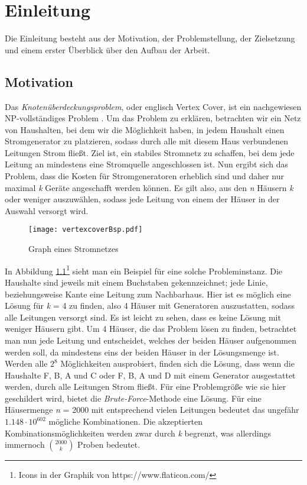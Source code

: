 
\chapter{Einleitung}
\label{ch:Einleitung}
Die Einleitung besteht aus der Motivation, der Problemstellung, der Zielsetzung und einem erster Überblick über den Aufbau der Arbeit.

\section{Motivation}
\label{ch:Einleitung:sec:Motivation}
Das \emph{Knotenüberdeckungsproblem}, oder englisch Vertex Cover, ist ein nachgewiesen NP-vollständiges Problem \cite{intract}. Um das Problem zu erklären, betrachten wir ein Netz von Haushalten, bei dem wir die Möglichkeit haben, in jedem Haushalt einen Stromgenerator zu platzieren, sodass durch alle mit diesem Haus verbundenen Leitungen Strom fließt. Ziel ist, ein stabiles Stromnetz zu schaffen, bei dem jede Leitung an mindestens eine Stromquelle angeschlossen ist. Nun ergibt sich das Problem, dass die Kosten für Stromgeneratoren erheblich sind und daher nur maximal \emph{k} Geräte angeschafft werden können. Es gilt also, aus den \emph{n} Häusern \emph{k} oder weniger auszuwählen, sodass jede Leitung von einem der Häuser in der Auswahl versorgt wird. 
\begin{figure}[htb]
\centering
  	{\texttt{[image: vertexcoverBsp.pdf]}}
	\caption{Graph eines Stromnetzes \label{fig:vc}}
\centering
\end{figure}
In Abbildung \ref{fig:vc}\footnote{Icons in der Graphik von https://www.flaticon.com/}   sieht man ein Beispiel für eine solche Probleminstanz. Die Haushalte sind jeweils mit einem Buchstaben gekennzeichnet; jede Linie, beziehungsweise Kante eine Leitung zum Nachbarhaus. Hier ist es möglich eine Lösung für \emph{k} = 4 zu finden, also 4 Häuser mit Generatoren auszustatten, sodass alle Leitungen versorgt sind. Es ist leicht zu sehen, dass es keine Lösung mit weniger Häusern gibt. Um 4 Häuser, die das Problem lösen zu finden, betrachtet man nun jede Leitung und entscheidet, welches der beiden Häuser aufgenommen werden soll, da mindestens eins der beiden Häuser in der Lösungsmenge ist. Werden alle $2^{8}$ Möglichkeiten ausprobiert, finden sich die Lösung, dass wenn die Haushalte F, B, A und C oder F, B, A und D mit einem Generator ausgestattet werden, durch alle Leitungen Strom fließt. Für eine Problemgröße wie sie hier geschildert wird, bietet die \emph{Brute-Force}-Methode eine Lösung. Für eine Häusermenge \emph{n} = 2000 mit entsprechend vielen Leitungen bedeutet das ungefähr $1.148 \cdot 10^{602}$ mögliche Kombinationen. Die akzeptierten Kombinationsmöglichkeiten werden zwar durch \emph{k} begrenzt, was allerdings immernoch $2000 \choose k$ Proben bedeutet.


